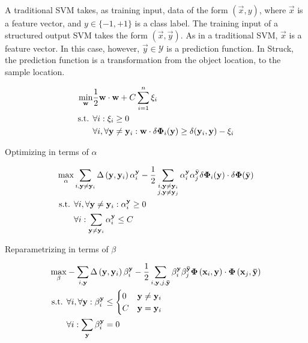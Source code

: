 \documentclass{IEEEtran}
\begin{document}
A traditional SVM takes, as training input, data of the form \((\vec{x}, y)\), where
\(\vec{x}\) is a feature vector, and \(y \in \{-1, +1\}\) is a class label. The training input of
a structured output SVM takes the form \((\vec{x}, \vec{y})\). As in a traditional SVM,
\(\vec{x}\) is a feature vector. In this case, however, \(\vec{y} \in \mathcal{Y}\) is a prediction
function. In Struck, the prediction function is a transformation from the object location, to the
sample location.

\begin{align}
    \min_{\mathbf{w}} & \frac{1}{2} \mathbf{w} \cdot \mathbf{w} + C \sum_{i=1}^n \xi_i \\
    \text{s.t. } & \forall i : \xi_i \ge 0 \nonumber \\
    & \forall i, \forall \mathbf{y} \ne \mathbf{y}_i : \mathbf{w} \cdot \delta \mathbf{\Phi}_i(\mathbf{y})
    \ge \delta(\mathbf{y}_i, \mathbf{y}) - \xi_i \nonumber
\end{align}

Optimizing in terms of \(\alpha\)

\begin{align}
    \max_\alpha & \sum_{i,\mathbf{y}\ne\mathbf{y}_i} \Delta\left(\mathbf{y}, \mathbf{y}_i\right)
    \alpha_i^{\mathbf{y}} - \frac{1}{2} \sum_{\substack{i,\mathbf{y}\ne\mathbf{y}_i \\ j,
    \mathbf{y}\ne\mathbf{y}_j}} \alpha_i^{\mathbf{y}} \alpha_j^{\bar{\mathbf{y}}} \delta
    \mathbf{\Phi}_i(\mathbf{y}) \cdot \delta \mathbf{\Phi}(\bar{\mathbf{y}}) \\
    \text{s.t. } & \forall i, \forall \mathbf{y} \ne \mathbf{y}_i : \alpha_i^{\mathbf{y}} \ge 0 \nonumber \\
    & \forall i : \sum_{\mathbf{y} \ne \mathbf{y}_i} \alpha_i^{\mathbf{y}} \le C \nonumber
\end{align}

Reparametrizing in terms of \(\beta\)

\begin{align}
    \max_\beta & -\sum_{i,\mathbf{y}} \Delta\left(\mathbf{y}, \mathbf{y}_i\right) \beta_i^{\mathbf{y}} - \frac{1}{2}
    \sum_{i,\mathbf{y},j,\mathbf{\bar{y}}} \beta_i^{\mathbf{y}} \beta_j^{\mathbf{\bar{y}}}
    \mathbf{\Phi}\left(\mathbf{x}_i, \mathbf{y}\right) \cdot \mathbf{\Phi}\left(\mathbf{x}_j,
    \mathbf{\bar{y}}\right) \\
    \text{s.t. } & \forall i, \forall \mathbf{y} : \beta_i^{\mathbf{y}} \le
    \begin{cases}
        0 & \mathbf{y} \ne \mathbf{y}_i \\
        C & \mathbf{y} = \mathbf{y}_i
    \end{cases} \nonumber \\
    & \forall i : \sum_{\mathbf{y}} \beta_i^{\mathbf{y}} = 0 \nonumber
\end{align}
\end{document}
